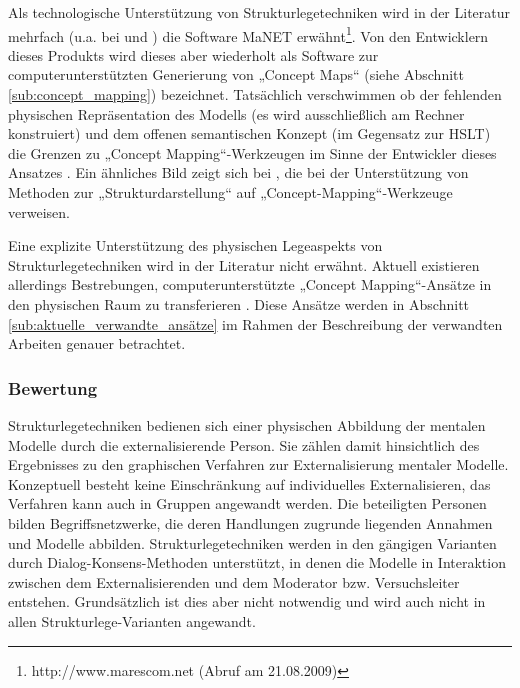 Als technologische Unterstützung von Strukturlegetechniken wird in der Literatur mehrfach (u.a. bei \citep{Huss03} und \citep{Ifenthaler06}) die Software \gls{MaNET} \citep{Eckert98} erwähnt\footnote{http://www.marescom.net (Abruf am 21.08.2009)}. Von den Entwicklern dieses Produkts wird dieses aber wiederholt als Software zur computerunterstützten Generierung von „Concept Maps“ (siehe Abschnitt \ref{sub:concept_mapping}) bezeichnet. Tatsächlich verschwimmen ob der fehlenden physischen Repräsentation des Modells (es wird ausschließlich am Rechner konstruiert) und dem offenen semantischen Konzept (im Gegensatz zur \gls{HSLT}) die Grenzen zu „Concept Mapping“-Werkzeugen im Sinne der Entwickler dieses Ansatzes \citep{Novak06}. Ein ähnliches Bild zeigt sich bei \citep{Mandl00}, die bei der Unterstützung von Methoden zur „Strukturdarstellung“ auf „Concept-Mapping“-Werkzeuge verweisen.

Eine explizite Unterstützung des physischen Legeaspekts von Strukturlegetechniken wird in der Literatur nicht erwähnt. Aktuell existieren allerdings Bestrebungen, computerunterstützte „Concept Mapping“-Ansätze in den physischen Raum zu transferieren \citep{Do-Lenh09} \citep{Tanenbaum09}. Diese Ansätze werden in Abschnitt \ref{sub:aktuelle_verwandte_ansätze} im Rahmen der Beschreibung der verwandten Arbeiten genauer betrachtet.

\subsubsection{Bewertung}

Strukturlegetechniken bedienen sich einer physischen Abbildung der mentalen Modelle durch die externalisierende Person. Sie zählen damit hinsichtlich des Ergebnisses zu den graphischen Verfahren zur Externalisierung mentaler Modelle. Konzeptuell besteht keine Einschränkung auf individuelles Externalisieren, das Verfahren kann auch in Gruppen angewandt werden. Die beteiligten Personen bilden Begriffsnetzwerke, die deren Handlungen zugrunde liegenden Annahmen und Modelle abbilden. Strukturlegetechniken werden in den gängigen Varianten durch Dialog-Konsens-Methoden unterstützt, in denen die Modelle in Interaktion zwischen dem Externalisierenden und dem Moderator bzw. Versuchsleiter entstehen. Grundsätzlich ist dies aber nicht notwendig und wird auch nicht in allen Strukturlege-Varianten angewandt.

